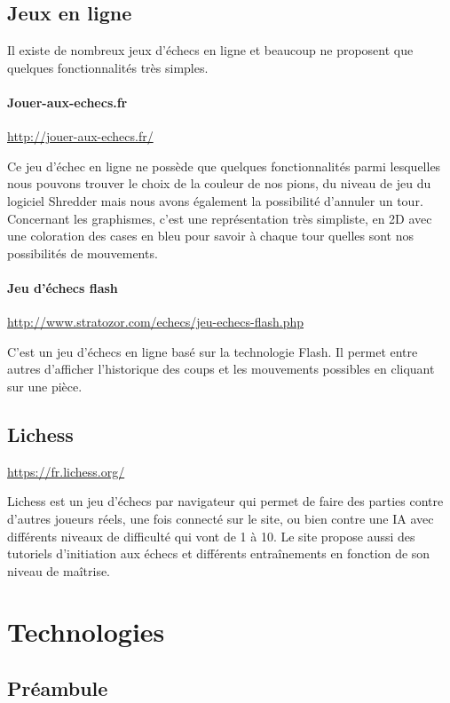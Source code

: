 \documentclass{article}
\begin{document}
\subsection{Jeux en ligne}
Il existe de nombreux jeux d'échecs en ligne et beaucoup ne proposent que quelques fonctionnalités très simples.

\paragraph{Jouer-aux-echecs.fr}
\url{http://jouer-aux-echecs.fr/}
\newline

Ce jeu d'échec en ligne ne possède que quelques fonctionnalités parmi lesquelles nous pouvons trouver le choix de la couleur de nos pions, du niveau de jeu du logiciel Shredder mais nous avons également la possibilité d'annuler un tour. Concernant les graphismes, c'est une représentation très simpliste, en 2D avec une coloration des cases en bleu pour savoir à chaque tour quelles sont nos possibilités de mouvements.

\paragraph{Jeu d'échecs flash}
\url{http://www.stratozor.com/echecs/jeu-echecs-flash.php}

C'est un jeu d'échecs en ligne basé sur la technologie Flash. Il permet entre autres d'afficher l'historique des coups et les mouvements possibles en cliquant sur une pièce. 

\subsection{Lichess}
\url{https://fr.lichess.org/}
\newline

Lichess est un jeu d'échecs par navigateur qui permet de faire des parties contre d'autres joueurs réels, une fois connecté sur le site, ou bien contre une IA avec différents niveaux de difficulté qui vont de 1 à 10. Le site propose aussi des tutoriels d'initiation aux échecs et différents entraînements en fonction de son niveau de maîtrise.



\newpage
\section{Technologies}
\subsection{Préambule}
\end{document}
